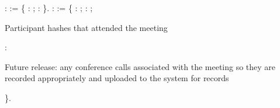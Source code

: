 \documentclass[12pt]{report}
\begin{document}
\begin{coqdoccode}
\coqdocnoindent
{}  :  :=  \{ : ;  : \}.\coqdoceol
\coqdocemptyline
\coqdocnoindent
{}  :  :=  \{\coqdoceol
\coqdocindent{1.00em}
 : ;\coqdoceol
\coqdocindent{1.00em}
 : ;\coqdoceol
\coqdocindent{1.00em}
\end{coqdoccode}
Participant hashes that attended the meeting\begin{coqdoccode}
\coqdocindent{1.00em}
 :  \coqdoceol
\coqdocindent{1.00em}
\end{coqdoccode}
Future release: any conference calls associated with the meeting so 
  they are recorded appropriately and uploaded to the system for records \begin{coqdoccode}
\coqdocnoindent
\}.\coqdoceol
\end{coqdoccode}
\end{document}
